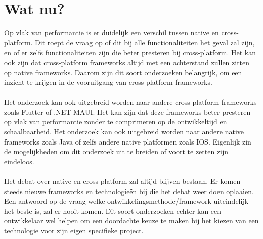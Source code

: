 \section{Wat nu?}
Op vlak van performantie is er duidelijk een verschil tussen native en cross-platform. 
Dit roept de vraag op of dit bij alle functionaliteiten het geval zal zijn, 
en of er zelfs functionaliteiten zijn die beter presteren bij cross-platform. 
Het kan ook zijn dat cross-platform frameworks altijd met een achterstand zullen zitten op native frameworks.
Daarom zijn dit soort onderzoeken belangrijk, om een inzicht te krijgen in de vooruitgang van cross-platform frameworks.
\\\\
Het onderzoek kan ook uitgebreid worden naar andere cross-platform frameworks zoals Flutter of 
.NET MAUI. Het kan zijn dat deze frameworks beter presteren op vlak van performantie zonder te 
comprimeren op de ontwikkeltijd en schaalbaarheid. Het onderzoek kan ook uitgebreid worden 
naar andere native frameworks zoals Java of zelfs andere native platformen zoals IOS. 
Eigenlijk zin de mogelijkheden om dit onderzoek uit te breiden of voort te zetten zijn eindeloos.
\\\\
Het debat over native en cross-platform zal altijd blijven bestaan. Er komen steeds nieuwe frameworks
en technologieën bij die het debat weer doen oplaaien. Een antwoord op de vraag welke 
ontwikkelingsmethode/framework uiteindelijk het beste is, zal er nooit komen. Dit soort onderzoeken 
echter kan een ontwikkelaar wel helpen om een doordachte keuze te maken 
bij het kiezen van een technologie voor zijn eigen specifieke project.







